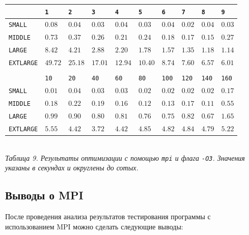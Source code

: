 \documentclass[a4paper, 11pt]{article}
\begin{document}
\begin{center}
    \begin{tabular}{l | l l l l l l l l l}
        & \texttt{1} & \texttt{2} & \texttt{3} & \texttt{4} & \texttt{5} & \texttt{6} & \texttt{7} & \texttt{8} & \texttt{9} \\
        \hline
        \texttt{SMALL}    & $0.08$ & $0.04$ & $0.03$ & $0.04$ & $0.03$ & $0.04$ & $0.02$ & $0.04$ & $0.03$ \\
        \texttt{MIDDLE}   & $0.73$ & $0.37$ & $0.26$ & $0.21$ & $0.24$ & $0.18$ & $0.17$ & $0.15$ & $0.27$ \\
        \texttt{LARGE}    & $8.42$ & $4.21$ & $2.88$ & $2.20$ & $1.78$ & $1.57$ & $1.35$ & $1.18$ & $1.14$ \\
        \texttt{EXTLARGE} & $49.72$ & $25.18$ & $17.01$ & $12.94$ & $10.40$ & $8.74$ & $7.60$ & $6.57$ & $6.01$ \\
        \vspace{0.4cm}\\
        & \texttt{10} & \texttt{20} & \texttt{40} & \texttt{60} & \texttt{80} & \texttt{100} & \texttt{120} & \texttt{140} & \texttt{160} \\
        \hline
        \texttt{SMALL}    & $0.01$ & $0.04$ & $0.03$ & $0.03$ & $0.02$ & $0.02$ & $0.02$ & $0.02$ & $0.17$ \\
        \texttt{MIDDLE}   & $0.18$ & $0.22$ & $0.19$ & $0.16$ & $0.12$ & $0.13$ & $0.17$ & $0.11$ & $0.55$ \\
        \texttt{LARGE}    & $0.99$ & $0.90$ & $0.80$ & $0.81$ & $0.76$ & $0.75$ & $0.82$ & $0.67$ & $1.65$ \\
        \texttt{EXTLARGE} & $5.55$ & $4.42$ & $3.72$ & $4.42$ & $4.85$ & $4.82$ & $4.84$ & $4.79$ & $5.22$ \\
    \end{tabular}\\
    \vspace{0.3cm}
    \small \it
    Таблица 9. Результаты оптимизации с помощью \texttt{mpi} и флага \texttt{-O3}. Значения указаны в секундах и округлены до сотых.
\end{center}
\newpage

\subsection*{Выводы о MPI}
После проведения анализа результатов тестирования программы с использованием MPI можно сделать следующие выводы:
\end{document}

